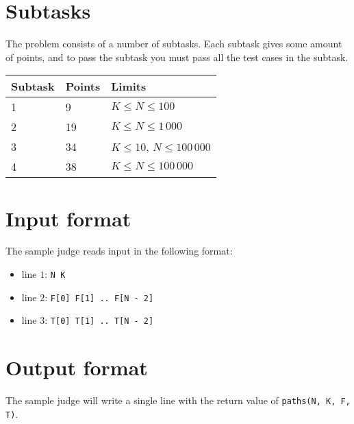 \section*{Subtasks}
The problem consists of a number of subtasks. Each subtask gives some amount of points, and to pass
the subtask you must pass all the test cases in the subtask.

\begin{tabular}{|l|l|l|}
  \hline
  \textbf{Subtask} & \textbf{Points} & \textbf{Limits} \\ \hline
  1 & 9 & $K \le N \le 100$ \\ \hline
  2 & 19 & $K \le N \le 1\,000$ \\ \hline
  3 & 34 & $K \le 10$, $N \le 100\,000$ \\ \hline
  4 & 38 & $K \le N \le 100\,000$ \\ \hline
\end{tabular}

\section*{Input format}
The sample judge reads input in the following format:

\begin{itemize}
  \item line $1$: \texttt{N K}
  \item line $2$: \texttt{F[0] F[1] .. F[N - 2]}
  \item line $3$: \texttt{T[0] T[1] .. T[N - 2]}
\end{itemize}

\section*{Output format}
The sample judge will write a single line with the return value of \texttt{paths(N, K, F, T)}.
